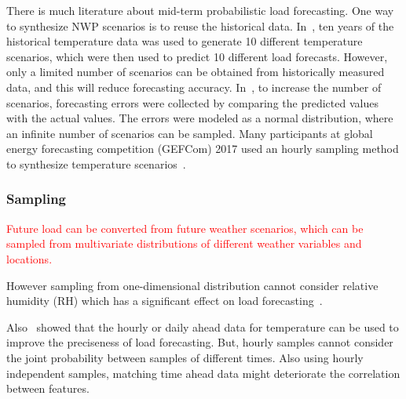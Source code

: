 \documentclass[journal]{IEEEtran} %
\begin{document}
There is much literature about mid-term probabilistic load forecasting. One way to synthesize NWP scenarios is to reuse the historical data. In~\cite{Tao2014}, ten years of the historical temperature data was used to generate 10 different temperature scenarios, which were then used to predict 10 different load forecasts. However, only a limited number of scenarios can be obtained from historically measured data, and this will reduce forecasting accuracy. In~\cite{Jingrui2015}, to increase the number of scenarios, forecasting errors were collected by comparing the predicted values with the actual values. The errors were modeled as a normal distribution, where an infinite number of scenarios can be sampled.  Many participants at global energy forecasting competition  (GEFCom) 2017 used an hourly sampling method to synthesize temperature scenarios~\cite{hong2019global}. 


\vspace{1in}







\subsubsection{Sampling}
\textcolor{red}{Future load can be converted from future weather scenarios, which can be sampled from multivariate distributions of different weather variables and locations.}



\vspace{1in}



However sampling from one-dimensional distribution cannot consider relative humidity (RH) which has a significant effect on load forecasting~\cite{xie2016relative}. 

Also~\cite{xie2017variable} showed that the hourly or daily ahead data for temperature can be used to improve the preciseness of load forecasting. But, hourly samples cannot consider the joint probability between samples of different times. Also using hourly independent samples, matching time ahead data might deteriorate the correlation between features.  
\end{document}
